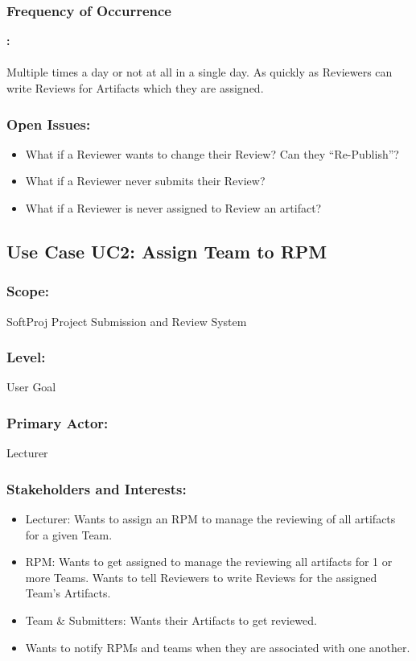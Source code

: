      \subsubsection*{Frequency of Occurrence}\textbf{:}
     \\
     \\
     Multiple times a day or not at all in a single day. As quickly as Reviewers can write Reviews for Artifacts which they are assigned.
     
     
     
     \subsubsection*{Open Issues:}
    \begin{itemize}
    \itemsep-1em 
       \item What if a Reviewer wants to change their Review? Can they “Re-Publish”?
       \item What if a Reviewer never submits their Review?
       \item What if a Reviewer is never assigned to Review an artifact?
    \end{itemize}
    
    
    
    
    
    
    \subsection*{Use Case UC2: Assign Team to RPM}
    \subsubsection*{Scope:} SoftProj Project Submission and Review System
    \subsubsection*{\textbf{Level:} }User Goal
    \subsubsection*{\textbf{Primary Actor:} } Lecturer
    \subsubsection*{\textbf{Stakeholders and Interests:}}
    \begin{itemize}
    \itemsep-1em 
        \item Lecturer: Wants to assign an RPM to manage the reviewing of all artifacts for a given Team.
        \item RPM: Wants to get assigned to manage the reviewing all artifacts for 1 or more Teams. Wants to tell Reviewers to write Reviews for the assigned Team’s Artifacts.
         \item Team \& Submitters: Wants their Artifacts to get reviewed.
          \item Wants to notify RPMs and teams when they are associated with one another.
        
    \end{itemize}
    
